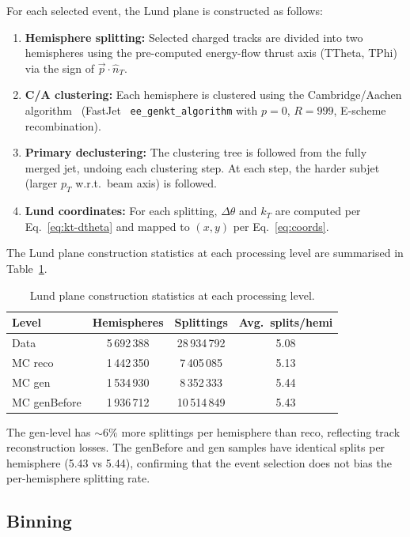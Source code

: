 \documentclass[11pt,a4paper]{article}
\begin{document}
For each selected event, the Lund plane is constructed as follows:
\begin{enumerate}
\item \textbf{Hemisphere splitting:} Selected charged tracks are
  divided into two hemispheres using the pre-computed energy-flow thrust
  axis (TTheta, TPhi) via the sign of $\vec{p} \cdot \hat{n}_T$.
\item \textbf{C/A clustering:} Each hemisphere is clustered using the
  Cambridge/Aachen algorithm~\cite{Dokshitzer:1997in}
  (FastJet~\cite{Cacciari:2011ma} \texttt{ee\_genkt\_algorithm} with
  $p = 0$, $R = 999$, E-scheme recombination).
\item \textbf{Primary declustering:} The clustering tree is followed
  from the fully merged jet, undoing each clustering step.  At each
  step, the harder subjet (larger $p_T$ w.r.t.\ beam axis) is followed.
\item \textbf{Lund coordinates:} For each splitting, $\Delta\theta$ and
  $k_T$ are computed per Eq.~\eqref{eq:kt-dtheta} and mapped to
  $(x, y)$ per Eq.~\eqref{eq:coords}.
\end{enumerate}

The Lund plane construction statistics at each processing level are
summarised in Table~\ref{tbl:lund-stats}.
\begin{table}[htbp]
\centering
\caption{Lund plane construction statistics at each processing level.}
\label{tbl:lund-stats}
\begin{tabular}{lccc}
\toprule
Level & Hemispheres & Splittings & Avg.\ splits/hemi \\
\midrule
Data & 5\,692\,388 & 28\,934\,792 & 5.08 \\
MC reco & 1\,442\,350 & 7\,405\,085 & 5.13 \\
MC gen & 1\,534\,930 & 8\,352\,333 & 5.44 \\
MC genBefore & 1\,936\,712 & 10\,514\,849 & 5.43 \\
\bottomrule
\end{tabular}
\end{table}

The gen-level has $\sim\!6\%$ more splittings per hemisphere than
reco, reflecting track reconstruction losses.  The genBefore and gen
samples have identical splits per hemisphere (5.43 vs 5.44),
confirming that the event selection does not bias the per-hemisphere
splitting rate.

\subsection{Binning}
\label{sec:binning}
\end{document}

